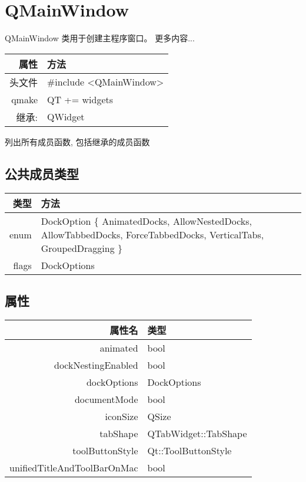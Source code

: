 \chapter{QMainWindow}

QMainWindow 类用于创建主程序窗口。 更多内容...


\begin{tabular}{|r|l|}
	\hline
	属性 & 方法 \\
	\hline
	头文件 & \#include <QMainWindow>\\      
	\hline
	qmake & QT += widgets\\      
	\hline
	继承: &	QWidget\\
	\hline
\end{tabular}

\begin{compactitem}
\item 列出所有成员函数, 包括继承的成员函数
\end{compactitem}

\section{公共成员类型}

\begin{tabular}{|r|m{25em}|}
	\hline
	类型 & 方法 \\
	\hline
    enum &	DockOption \{ AnimatedDocks, AllowNestedDocks, AllowTabbedDocks, ForceTabbedDocks, VerticalTabs, GroupedDragging \} \\ 
    \hline
    flags &	DockOptions \\ 
	\hline
\end{tabular}

\section{属性}

\begin{tabular}{|r|l|}
	\hline
    属性名 &	类型 \\ 
    \hline
    animated 	& bool \\ 
    \hline
    dockNestingEnabled &	bool\\
    \hline
    dockOptions &	DockOptions\\
    \hline
    documentMode 	&bool\\
    \hline
    iconSize  &	QSize\\
    \hline
    tabShape 	&QTabWidget::TabShape\\
    \hline
    toolButtonStyle &	Qt::ToolButtonStyle\\
    \hline
    unifiedTitleAndToolBarOnMac &	bool\\
	\hline
\end{tabular}

